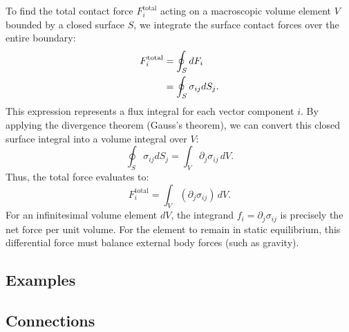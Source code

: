 To find the total contact force $F_i^{\text{total}}$ acting on a macroscopic volume element $V$ bounded by a closed surface $S$, we integrate the surface contact forces over the entire boundary:
\begin{align}
  F_i^{\text{total}} &= \oint_S dF_i \notag\\
                     &= \oint_S \sigma_{ij} dS_j.
  \label{eq:lec01:surface_integral}
\end{align}
This expression represents a flux integral for each vector component $i$. By applying the divergence theorem (Gauss's theorem), we can convert this closed surface integral into a volume integral over $V$:
\begin{equation}
  \oint_S \sigma_{ij} dS_j = \int_V \partial_j \sigma_{ij} \, dV.
  \label{eq:lec01:divergence_thm}
\end{equation}
Thus, the total force evaluates to:
\begin{equation}
  F_i^{\text{total}} = \int_V (\partial_j \sigma_{ij}) \, dV.
\end{equation}
For an infinitesimal volume element $dV$, the integrand $f_i = \partial_j \sigma_{ij}$ is precisely the net force per unit volume. For the element to remain in static equilibrium, this differential force must balance external body forces (such as gravity).

\subsection*{Examples}


\subsection*{Connections}

